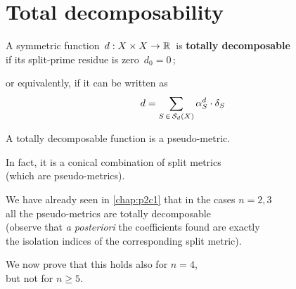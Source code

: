 \documentclass[./main.tex]{subfiles}
\begin{document}
\ifSubfilesClassLoaded{\mainmatter}{}

\chapter{Total decomposability} \label{chap:p2c4}

\begin{definition}
    A symmetric function $\, d : {X \times X} \to \mathbb{R} \,$ is \textbf{totally decomposable} \\
    \bsp if its split-prime residue is zero $\, d_0 = 0 \,$;
    
    or equivalently, if it can be written as
    \[ d = \sum_{S \,\in\, {\mathcal{S}}_d(X)} \alpha_S^d \cdot \delta_S \]
\end{definition} \bigskip

\begin{remark}
    A totally decomposable function is a pseudo-metric.
    
    In fact, it is a conical combination of split metrics \\
    \bsp (which are pseudo-metrics).
\end{remark}

\begin{remark}
    We have already seen in \autoref{chap:p2c1} that in the cases $n = 2,3$ \\
    \bsp all the pseudo-metrics are totally decomposable \\
    (observe that \textit{a posteriori} the coefficients found are exactly \\
    \bsp the isolation indices of the corresponding split metric).

    We now prove that this holds also for $n = 4$, \\
    \bsp but not for $n \geq 5$.
\end{remark}

\clearpage
\end{document}

